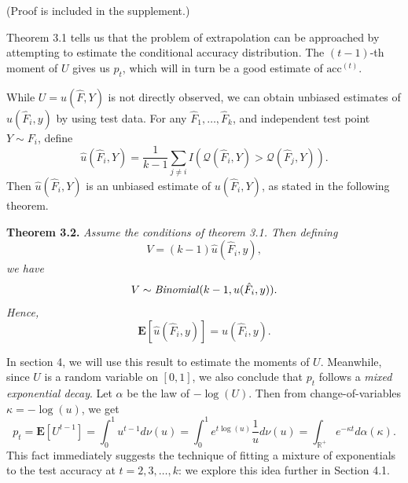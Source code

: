 \documentclass{article}
\newcommand{\E}{\textbf{E}}
\begin{document}
(Proof is included in the supplement.)


Theorem 3.1 tells us that the problem of extrapolation can be
approached by attempting to estimate the conditional accuracy
distribution.  The $(t-1)$-th moment of $U$ gives us $p_t$, which will
in turn be a good estimate of $\text{acc}^{(t)}$.

While $U = u(\hat{F}, Y)$ is not directly observed, we can obtain unbiased estimates of $u(\hat{F}_i, y)$
by using test data.  For any $\hat{F}_1,\hdots, \hat{F}_k$, and independent test point $Y \sim F_i$, define
\begin{equation}\label{eq:hatu}
\hat{u}(\hat{F}_i, Y) = \frac{1}{k -1}\sum_{j \neq i} I(\mathcal{Q}(\hat{F}_i, Y) > \mathcal{Q}(\hat{F}_j, Y)).
\end{equation}
Then $\hat{u}(\hat{F}_i, Y)$ is an unbiased estimate of $u(\hat{F}_i, Y)$, as stated in the following theorem.

\noindent\textbf{Theorem 3.2.}\emph{
Assume the conditions of theorem 3.1.
Then defining 
\begin{equation}\label{eq:veq}
V = (k-1)\hat{u}(\hat{F}_i, y),\end{equation}
we have
\[V \sim \text{\emph{Binomial}}(k-1, u(\hat{F}_i, y)).\]
Hence,
\[\E[\hat{u}(\hat{F}_i, y)] = u(\hat{F}_i, y).\]
}

In section 4, we will use this result to estimate the moments of $U$.
Meanwhile, since $U$ is a random variable on $[0, 1]$, we also conclude that $p_t$ follows a \emph{mixed exponential decay}.
Let $\alpha$ be the law of $-\log(U)$.
Then from change-of-variables $\kappa =-\log(u)$, we get
\[p_t = \E[U^{t-1}] = 
\int_0^1 u^{t-1} d\nu(u) = \int_0^1 e^{t\log(u)} \frac{1}{u}d\nu(u) = 
\int_{\mathbb{R}^{+}} e^{-\kappa t} d\alpha(\kappa).\]
This fact immediately suggests the technique of fitting a mixture of exponentials to the test accuracy at $t =2,3,\hdots, k$:
we explore this idea further in Section 4.1.
\end{document}
